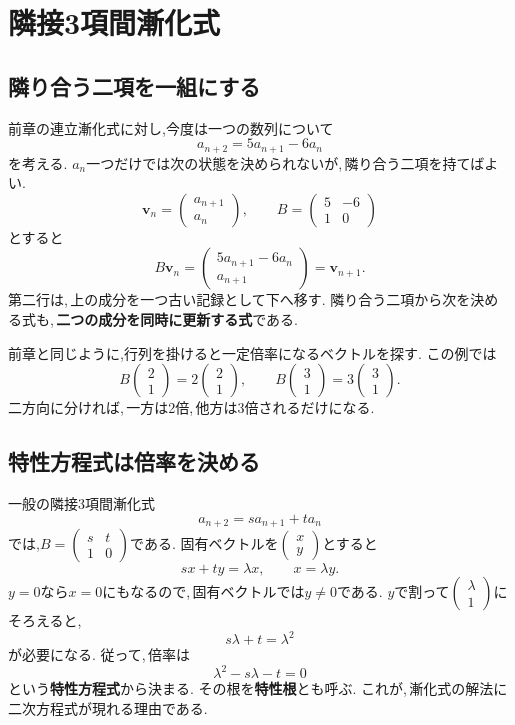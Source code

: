\section{隣接3項間漸化式}\label{節：隣接3項間漸化式}
\subsection{隣り合う二項を一組にする}

前章の連立漸化式に対し,今度は一つの数列について
\[
 a_{n+2}=5a_{n+1}-6a_n
\]
を考える.
$a_n$一つだけでは次の状態を決められないが,\,隣り合う二項を持てばよい.
\[
 \boldsymbol v_n=\begin{pmatrix}a_{n+1}\\a_n\end{pmatrix},
 \qquad B=\begin{pmatrix}5&-6\\1&0\end{pmatrix}
\]
とすると
\[
 B\boldsymbol v_n
 =\begin{pmatrix}5a_{n+1}-6a_n\\a_{n+1}\end{pmatrix}
 =\boldsymbol v_{n+1}.
\]
第二行は,\,上の成分を一つ古い記録として下へ移す.
隣り合う二項から次を決める式も,\,\textbf{二つの成分を同時に更新する式}である.

前章と同じように,行列を掛けると一定倍率になるベクトルを探す.
この例では
\[
 B\begin{pmatrix}2\\1\end{pmatrix}
 =2\begin{pmatrix}2\\1\end{pmatrix},
 \qquad
 B\begin{pmatrix}3\\1\end{pmatrix}
 =3\begin{pmatrix}3\\1\end{pmatrix}.
\]
二方向に分ければ,\,一方は2倍,\,他方は3倍されるだけになる.

\subsection{特性方程式は倍率を決める}\label{節：特性方程式は倍率を決める}

一般の隣接3項間漸化式
\[
 a_{n+2}=s a_{n+1}+t a_n
\]
では,$B=\begin{pmatrix}s&t\\1&0\end{pmatrix}$である.
固有ベクトルを$\begin{pmatrix}x\\y\end{pmatrix}$とすると
\[
 sx+ty=\lambda x,\qquad x=\lambda y.
\]
$y=0$なら$x=0$にもなるので,\,固有ベクトルでは$y\ne0$である.
$y$で割って$\begin{pmatrix}\lambda\\1\end{pmatrix}$にそろえると,
\[
 s\lambda+t=\lambda^2
\]
が必要になる. 従って,\,倍率は
\[
 \lambda^2-s\lambda-t=0
\]
という\textbf{特性方程式}から決まる.
その根を\textbf{特性根}とも呼ぶ.
これが,\,漸化式の解法に二次方程式が現れる理由である.

